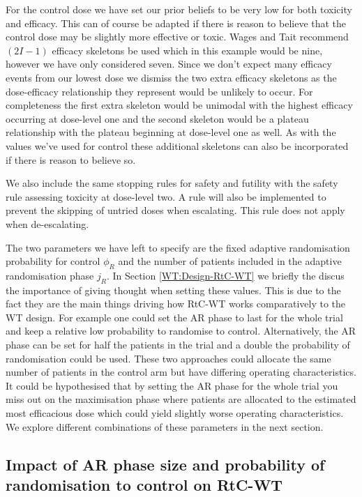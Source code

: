  For the control dose we have set our prior beliefs to be very low for both toxicity and efficacy. This can of course be adapted if there is reason to believe that the control dose may be slightly more effective or toxic. Wages and Tait recommend $(2I-1)$ efficacy skeletons be used which in this example would be nine, however we have only considered seven. Since we don't expect many efficacy events from our lowest dose we dismiss the two extra efficacy skeletons as the dose-efficacy relationship they represent would be unlikely to occur. For completeness the first extra skeleton would be unimodal with the highest efficacy occurring at dose-level one and the second skeleton would be a plateau relationship with the plateau beginning at dose-level one as well. As with the values we've used for control these additional skeletons can also be incorporated if there is reason to believe so. 
 
 We also include the same stopping rules for safety and futility with the safety rule assessing toxicity at dose-level two. A rule will also be implemented to prevent the skipping of untried doses when escalating. This rule does not apply when de-escalating. 
 
 The two parameters we have left to specify are the fixed adaptive randomisation probability for control $\phi_R$ and the number of patients included in the adaptive randomisation phase $j_R$. In Section \ref{WT:Design-RtC-WT} we briefly the discus the importance of giving thought when setting these values. This is due to the fact they are the main things driving how RtC-WT works comparatively to the WT design. For example one could set the AR phase to last for the whole trial and keep a relative low probability to randomise to control. Alternatively, the AR phase can be set for half the patients in the trial and a double the probability of randomisation could be used. These two approaches could allocate the same number of patients in the control arm but have differing operating characteristics. It could be hypothesised that by setting the AR phase for the whole trial you miss out on the maximisation phase where patients are allocated to the estimated most efficacious dose which could yield slightly worse operating characteristics. We explore different combinations of these parameters in the next section. 
 
 \subsection{Impact of AR phase size and probability of randomisation to control on RtC-WT}
 \label{WT:Impact-ARandRTCon-RtC-WT}
 
